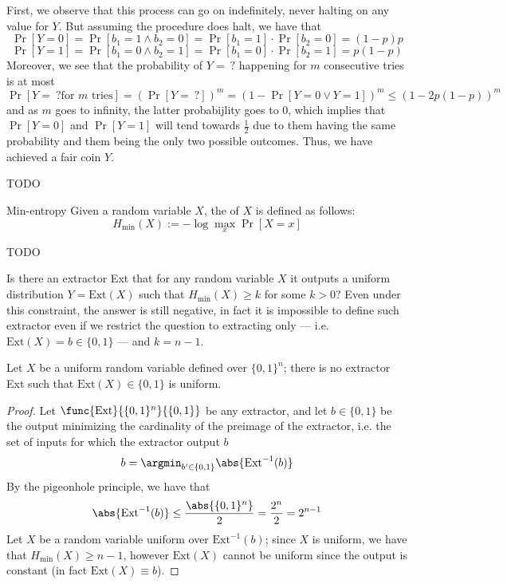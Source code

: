 \documentclass[a4paper, 12pt]{report}
\begin{document}
First, we observe that this process can go on indefinitely, never halting on any value for $Y$. But assuming the procedure does halt, we have that $$\Pr[Y = 0] = \Pr[b_1 = 1 \land b_2 = 0] = \Pr[b_1 = 1] \cdot \Pr[b_2 = 0] = (1 - p)p$$ $$\Pr[Y = 1] = \Pr[b_1 = 0 \land b_2 = 1] = \Pr[b_1 = 0] \cdot \Pr[b_2 = 1] = p(1 - p)$$ Moreover, we see that the probability of $Y = \ ?$ happening for $m$ consecutive tries is at most $$\Pr[Y = \ ? \mbox{for $m$ tries}] = (\Pr[Y = \ ?])^m = (1 - \Pr[Y = 0 \lor Y = 1])^m \le (1 - 2p(1 - p))^m$$ and as $m$ goes to infinity, the latter probabijlity goes to 0, which implies that $\Pr[Y = 0]$ and $\Pr[Y = 1]$ will tend towards $\tfrac{1}{2}$ due to them having the same probability and them being the only two possible outcomes. Thus, we have achieved a fair coin $Y$.

TODO 

\begin{frameddefn}{Min-entropy}
	Given a random variable $X$, the  of $X$ is defined as follows: $$H_{\mathrm{min}}(X) := - \log{\max_x{\Pr[X = x]}}$$
\end{frameddefn}

TODO 

Is there an extractor Ext that for any random variable $X$ it outputs a uniform distribution $Y = \mbox{Ext}(X)$ such that $H_\mathrm{min}(X) \ge k$ for some $k > 0$? Even under this constraint, the answer is still negative, in fact it is impossible to define such extractor even if we restrict the question to extracting only  --- i.e. $\mbox{Ext}(X) = b \in \{0, 1\}$ --- and $k = n - 1$.

\begin{framedprop}{}
	Let $X$ be a uniform random variable defined over $\{0, 1\}^n$; there is no extractor Ext such that $\mbox{Ext}(X) \in \{0, 1\}$ is uniform.
\end{framedprop}

\begin{proof}
	Let $\func{\mbox{Ext}}{\{0, 1\}^n}{\{0, 1\}}$ be any extractor, and let $b \in \{0, 1\}$ be the output minimizing the cardinality of the preimage of the extractor, i.e. the set of inputs for which the extractor output $b$ $$b = \argmin_{b' \in \{0, 1\}}{\abs{\mbox{Ext}^{-1}(b)}}$$ By the pigeonhole principle, we have that $$\abs{\mbox{Ext}^{-1}(b)} \le \dfrac{\abs{\{0, 1\}^n}}{2} = \dfrac{2^n}{2} = 2^{n - 1}$$ Let $X$ be a random variable uniform over $\mbox{Ext}^{-1}(b)$; since $X$ is uniform, we have that $H_\mathrm{min}(X) \ge n- 1$, however $\mbox{Ext}(X)$ cannot be uniform since the output is constant (in fact $\mbox{Ext}(X) \equiv b$).
\end{proof}
\end{document}
